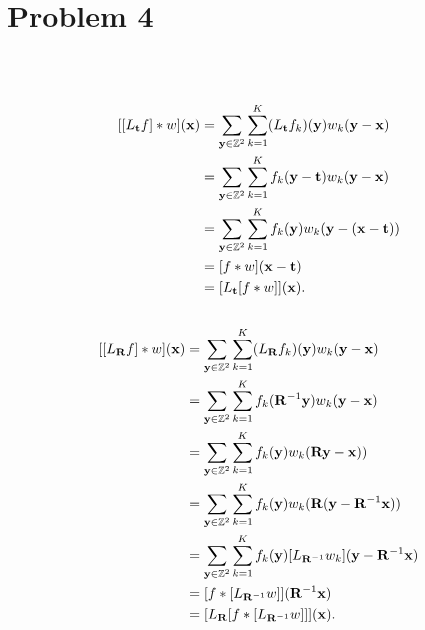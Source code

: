 \section{Problem 4}~\label{sec:prob4}

\subsection{} %

\begin{equation}
\begin{split}
[[L_\bt f] * w](\bx)
    & = \sum_{\by\in \zz^2}\sum_{k=1}^K (L_\bt f_k)(\by) w_k(\by-\bx)  \\
    & = \sum_{\by\in \zz^2}\sum_{k=1}^K f_k(\by-\bt) w_k(\by-\bx)  \\
    & = \sum_{\by\in \zz^2}\sum_{k=1}^K f_k(\by) w_k(\by-(\bx-\bt))  \\
    & = [ f * w](\bx-\bt) \\
    & = [L_\bt[ f * w]](\bx).
\end{split}
\end{equation}

\subsection{} %

\begin{equation}
\begin{split}
[[L_\bR f] * w](\bx)
    & = \sum_{\by\in \zz^2}\sum_{k=1}^K (L_\bR f_k)(\by) w_k(\by-\bx)  \\
    & = \sum_{\by\in \zz^2}\sum_{k=1}^K f_k(\bR^{-1} \by) w_k(\by-\bx)  \\
    & = \sum_{\by\in \zz^2}\sum_{k=1}^K f_k(\by) w_k(\bR\by-\bx))  \\
    & = \sum_{\by\in \zz^2}\sum_{k=1}^K f_k(\by) w_k(\bR(\by-\bR^{-1} \bx))  \\
    & = \sum_{\by\in \zz^2}\sum_{k=1}^K f_k(\by) [L_{\bR^{-1}} w_k](\by-\bR^{-1} \bx)  \\
    & = [ f *  [L_{\bR^{-1}} w]](\bR^{-1} \bx) \\
    & = [L_\bR[ f * [L_{\bR^{-1}} w]]](\bx).
\end{split}
\end{equation}

\subsection{} %
